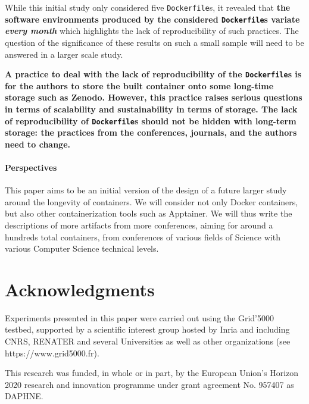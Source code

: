 \documentclass[sigconf,natbib=false]{acmart}
\newcommand{\df}{\texttt{Dockerfile}}
\begin{document}
While this initial study only considered five \df s, it revealed that \textbf{the software environments produced by the considered \df s variate \emph{every month}} which highlights the lack of reproducibility of such practices.
The question of the significance of these results on such a small sample will need to be answered in a larger scale study.

\textbf{
  A practice to deal with the lack of reproducibility of the \df s is for the authors to store the built container onto some long-time storage such as Zenodo.
  However, this practice raises serious questions in terms of scalability and sustainability in terms of storage.
  The lack of reproducibility of \df s should not be hidden with long-term storage: the practices from the conferences, journals, and the authors need to change.
}

\paragraph{Perspectives}

This paper aims to be an initial version of the design of a future larger study around the longevity of containers.
We will consider not only Docker containers, but also other containerization tools such as Apptainer.
We will thus write the descriptions of more artifacts from more conferences, aiming for around a hundreds total containers, from conferences of various fields of Science with various Computer Science technical levels.


%

\section*{Acknowledgments}


Experiments presented in this paper were carried out using the Grid'5000 testbed, supported by a scientific interest group hosted by Inria and including CNRS, RENATER and several Universities as well as other organizations (see https://www.grid5000.fr). 

This research was funded, in whole or in part, by the European Union’s Horizon 2020 research and innovation programme under grant agreement No. 957407 as DAPHNE.


\newpage
\newpage
%
%
\printbibliography
\end{document}
